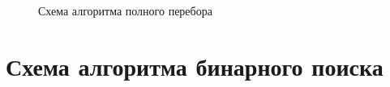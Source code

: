 \clearpage
\begin{figure}[h!]
	
	
	\caption{Схема алгоритма полного перебора}
	
	\label{fig:full_search}
	
\end{figure}


\clearpage
\section{Схема алгоритма бинарного поиска}

